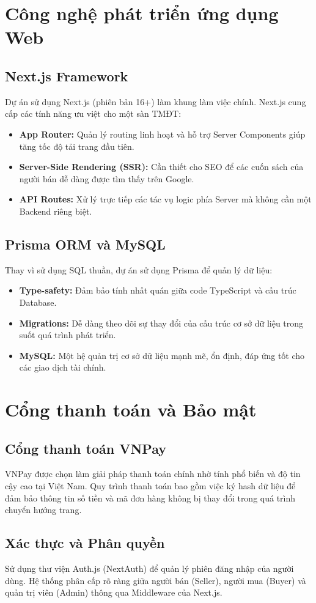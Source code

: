 \documentclass[../main.tex]{subfiles}
\begin{document}
\section{Công nghệ phát triển ứng dụng Web}

\subsection{Next.js Framework}
Dự án sử dụng Next.js (phiên bản 16+) làm khung làm việc chính. Next.js cung cấp các tính năng ưu việt cho một sàn TMĐT:
\begin{itemize}
    \item \textbf{App Router:} Quản lý routing linh hoạt và hỗ trợ Server Components giúp tăng tốc độ tải trang đầu tiên.
    \item \textbf{Server-Side Rendering (SSR):} Cần thiết cho SEO để các cuốn sách của người bán dễ dàng được tìm thấy trên Google.
    \item \textbf{API Routes:} Xử lý trực tiếp các tác vụ logic phía Server mà không cần một Backend riêng biệt.
\end{itemize}

\subsection{Prisma ORM và MySQL}
Thay vì sử dụng SQL thuần, dự án sử dụng Prisma để quản lý dữ liệu:
\begin{itemize}
    \item \textbf{Type-safety:} Đảm bảo tính nhất quán giữa code TypeScript và cấu trúc Database.
    \item \textbf{Migrations:} Dễ dàng theo dõi sự thay đổi của cấu trúc cơ sở dữ liệu trong suốt quá trình phát triển.
    \item \textbf{MySQL:} Một hệ quản trị cơ sở dữ liệu mạnh mẽ, ổn định, đáp ứng tốt cho các giao dịch tài chính.
\end{itemize}

\section{Cổng thanh toán và Bảo mật}

\subsection{Cổng thanh toán VNPay}
VNPay được chọn làm giải pháp thanh toán chính nhờ tính phổ biến và độ tin cậy cao tại Việt Nam. Quy trình thanh toán bao gồm việc ký hash dữ liệu để đảm bảo thông tin số tiền và mã đơn hàng không bị thay đổi trong quá trình chuyển hướng trang.

\subsection{Xác thực và Phân quyền}
Sử dụng thư viện Auth.js (NextAuth) để quản lý phiên đăng nhập của người dùng. Hệ thống phân cấp rõ ràng giữa người bán (Seller), người mua (Buyer) và quản trị viên (Admin) thông qua Middleware của Next.js.
\end{document}
